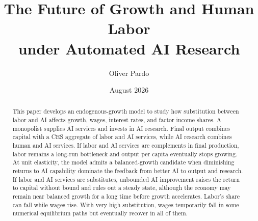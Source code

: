 \documentclass[11pt]{article}
\title{The Future of Growth and Human Labor\\
under Automated AI Research}
\author{Oliver Pardo}
\date{August 2026}
\theoremstyle{definition}
\theoremstyle{plain}
\begin{document}
\maketitle

\begin{abstract}
This paper develops an endogenous-growth model to study how substitution between
labor and AI affects growth, wages, interest rates, and factor income shares. A
monopolist supplies AI services and invests in AI research. Final output combines
capital with a CES aggregate of labor and AI services, while AI research combines
human and AI services. If labor and AI services are complements in final production,
labor remains a long-run bottleneck and output per capita eventually stops growing.
At unit elasticity, the model admits a balanced-growth candidate when diminishing
returns to AI capability dominate the feedback from better AI to output and
research. If labor and AI services are substitutes, unbounded AI improvement raises
the return to capital without bound and rules out a steady state, although the
economy may remain near balanced growth for a long time before growth accelerates.
Labor's share can fall while wages rise. With very high substitution, wages
temporarily fall in some numerical equilibrium paths but eventually recover in all
of them.
\end{abstract}

\onehalfspacing













\appendix

\end{document}

